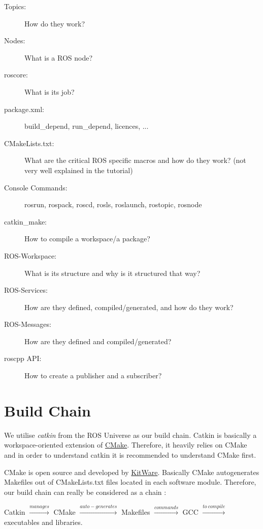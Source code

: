 \begin{description}
  \item [Topics:] How do they work?
  \item [Nodes:] What is a ROS node?
  \item [roscore:] What is its job?
  \item [package.xml:] build\_depend, run\_depend, licences, ...
  \item [CMakeLists.txt:] What are the critical ROS specific macros and how do they work? (not very well explained in the tutorial)
  \item [Console Commands:] rosrun, rospack, roscd, rosls, roslaunch, rostopic, rosnode
  \item [catkin\_make:] How to compile a workspace/a package?
  \item [ROS-Workspace:] What is its structure and why is it structured that way?
  \item [ROS-Services:] How are they defined, compiled/generated, and how do they work?
  \item [ROS-Messages:] How are they defined and compiled/generated?
  \item [roscpp API:] How to create a publisher and a subscriber?
\end{description}

\section{Build Chain}
\label{sec:BuildChain}

We utilise \emph{catkin} from the ROS Universe as our build chain. Catkin is basically a workspace-oriented extension of \href{http://www.cmake.org/}{CMake}. Therefore, it heavily relies on CMake and in order to understand catkin it is recommended to understand CMake first.

CMake is open source and developed by \href{http://www.kitware.com/company/about.html}{KitWare}. Basically CMake autogenerates Makefiles out of CMakeLists.txt files located in each software module. Therefore, our build chain can really be considered as a chain \smiley: 

Catkin $\xrightarrow{manages}$ CMake $\xrightarrow{auto-generates}$ Makefiles $\xrightarrow{commands}$ GCC $\xrightarrow{to\ compile}$ executables and libraries.
